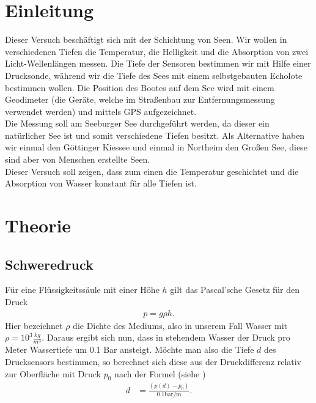 \documentclass[12pt,a4paper,titlepage,headinclude,bibtotoc]{scrartcl}
\numberwithin{equation}{subsection}
\begin{document}
\setcounter{footnote}{0}
\setcounter{page}{1}
\section{Einleitung}
\label{sec:einleitung}
Dieser Versuch beschäftigt sich mit der Schichtung von Seen.
Wir wollen in verschiedenen Tiefen die Temperatur, die Helligkeit und die Absorption von zwei Licht-Wellenlängen messen.
Die Tiefe der Sensoren bestimmen wir mit Hilfe einer Drucksonde, während wir die Tiefe des Sees mit einem selbstgebauten Echolote bestimmen wollen.
Die Position des Bootes auf dem See wird mit einem Geodimeter (die Geräte, welche im Straßenbau zur Entfernungsmessung verwendet werden) und mittels GPS aufgezeichnet.\\
Die Messung soll am Seeburger See durchgeführt werden, da dieser ein natürlicher See ist und somit verschiedene Tiefen besitzt.
Als Alternative haben wir einmal den Göttinger Kiessee und einmal in Northeim den Großen See, diese sind aber von Menschen erstellte Seen.\\
Dieser Versuch soll zeigen, dass zum einen die Temperatur geschichtet und die Absorption von Wasser konstant für alle Tiefen ist.


\section{Theorie}
\label{sec:theorie}
\subsection{Schweredruck}

Für eine Flüssigkeitssäule mit einer Höhe $h$ gilt das Pascal'sche Gesetz für den Druck
\begin{align}
 p= g \rho h.
\end{align}
Hier bezeichnet $\rho$ die Dichte des Mediums, also in unserem Fall Wasser mit $\rho = 10^3 \frac{kg}{m^3}$. Daraus ergibt sich nun, dass in stehendem Wasser der Druck pro Meter Wassertiefe um 0.1 Bar ansteigt.
Möchte man also die Tiefe $d$ des Drucksensors bestimmen, so berechnet sich diese aus der Druckdifferenz relativ zur Oberfläche mit Druck $p_0$ nach der Formel (siehe \cite[S.118]{gerthsen})
\begin{align}
	d&=\frac{(p(d)-p_0)}{0.1\si{\bar \per\metre}}. \label{eq:d}
\end{align}

\end{document}
